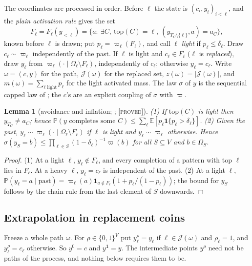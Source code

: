 \documentclass[10pt,reqno]{amsart}
\newtheorem{lemma}[theorem]{Lemma}
\theoremstyle{definition}
\theoremstyle{remark}
\newcommand{\E}{\mathbb E}
\newcommand{\Prob}{\mathbb P}
\newcommand{\ind}{\mathbf 1}
\newcommand{\lab}[1]{\textup{[\textsc{#1}]}}
\begin{document}
The coordinates are processed in order.  Before $\ell$ the state is
$(c_i,y_i)_{i<\ell}$, and the \emph{plain activation rule} gives the set
\[
 F_\ell=F_\ell(y_{<\ell})=\{a:\ \exists C,\ \mathrm{top}(C)=\ell,\ (y_{T_C\setminus\{\ell\}},a)=a_C\},
\]
known before $\ell$ is drawn; put $p_\ell=\varpi_\ell(F_\ell)$, and call
$\ell$ \emph{light} if $p_\ell\leq\delta_\ell$.  Draw $c_\ell\sim\varpi_\ell$
independently of the past.  If $\ell$ is light and $c_\ell\in F_\ell$
($\ell$ is \emph{replaced}), draw $y_\ell$ from
$\varpi_\ell(\cdot\mid\Omega_\ell\setminus F_\ell)$, independently of
$c_\ell$; otherwise $y_\ell=c_\ell$.  Write $\omega=(c,y)$ for the path,
$\mathcal J(\omega)$ for the replaced set, $z(\omega)=|\mathcal J(\omega)|$, and
$m(\omega)=\sum_{\ell\text{ light}}p_\ell$ for the light activated mass.
The law $\sigma$ of $y$ is the sequential capped law of \cite[\S6]{TW}; the
$c$'s are an explicit coupling of $\sigma$ with $\varpi$.

\begin{lemma}[avoidance and inflation; {\cite[Lemma~2.1]{KA}}; \lab{proved}]\label{lem:kavoid}
(1) If $\mathrm{top}(C)$ is light then $y_{T_C}\neq a_C$; hence
$\Prob(y\text{ completes some }C)\leq\sum_\ell\E[p_\ell\ind\{p_\ell>\delta_\ell\}]$.
(2) Given the past, $y_\ell\sim\varpi_\ell(\cdot\mid\Omega_\ell\setminus F_\ell)$
if $\ell$ is light and $y_\ell\sim\varpi_\ell$ otherwise.  Hence
$\sigma(y_S=b)\leq\prod_{\ell\in S}(1-\delta_\ell)^{-1}\varpi(b)$ for all
$S\subseteq V$ and $b\in\Omega_S$.
\end{lemma}
\begin{proof}
(1) At a light $\ell$, $y_\ell\notin F_\ell$, and every completion of a
pattern with top $\ell$ lies in $F_\ell$.  At a heavy $\ell$, $y_\ell=c_\ell$
is independent of the past.  (2) At a light $\ell$,
$\Prob(y_\ell=a\mid\text{past})=\varpi_\ell(a)\ind_{a\notin F_\ell}(1+p_\ell/(1-p_\ell))$;
the bound for $y_S$ follows by the chain rule from the last element of
$S$ downwards.
\end{proof}

\subsection{Extrapolation in replacement coins}
Freeze a whole path $\omega$.  For $\rho\in\{0,1\}^V$ put $y^\rho_\ell=y_\ell$
if $\ell\in \mathcal J(\omega)$ and $\rho_\ell=1$, and $y^\rho_\ell=c_\ell$ otherwise.
So $y^0=c$ and $y^{\mathbf 1}=y$.  The intermediate points $y^\rho$ need not
be paths of the process, and nothing below requires them to be.
\end{document}
